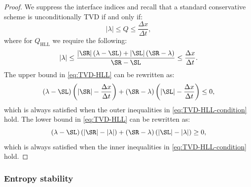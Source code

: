 \begin{proof}
We suppress the interface indices and recall that a standard conservative scheme is unconditionally TVD if and only if:
\begin{equation}
\left| \lambda \right| \leq Q \leq \frac{\Delta x}{\Delta t},
\end{equation}
where for $ Q_{\text{HLL}} $ we require the following:
\begin{equation} \label{eq:TVD-HLL}
\left| \lambda \right| \leq \frac{\left| \SR \right| \left( \lambda - \SL \right) + \left| \SL \right| \left( \SR - \lambda \right)}{\SR - \SL} \leq \frac{\Delta x}{\Delta t}.
\end{equation}
The upper bound in \eqref{eq:TVD-HLL} can be rewritten as:
\begin{equation}
\left( \lambda - \SL \right) \left( |\SR|- \frac{\Delta x}{\Delta t} \right) + \left( \SR-\lambda \right) \left( |\SL|-\frac{\Delta x}{\Delta t} \right) \leq 0,
\end{equation}
which is always satisfied when the outer inequalities in \eqref{eq:TVD-HLL-condition} hold. The lower bound in \eqref{eq:TVD-HLL} can be rewritten as:
\begin{equation} 
\left( \lambda - \SL \right) \left( |\SR|- |\lambda| \right) + \left( \SR-\lambda \right) \left( |\SL|- |\lambda| \right) \geq 0, \label{eq:TVD-HLL-lower}
\end{equation}
which is always satisfied when the inner inequalities in \eqref{eq:TVD-HLL-condition} hold. \end{proof}

%

\subsubsection*{Entropy stability}

